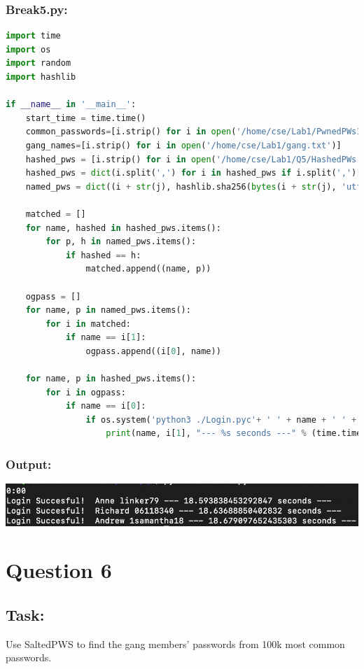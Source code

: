 \documentclass{article}
\begin{document}
\subsubsection*{Break5.py:}
\begin{lstlisting}[language=Python]
import time
import os
import random
import hashlib

if __name__ in '__main__': 
    start_time = time.time()
    common_passwords=[i.strip() for i in open('/home/cse/Lab1/PwnedPWs100k.txt')]
    gang_names=[i.strip() for i in open('/home/cse/Lab1/gang.txt')]
    hashed_pws = [i.strip() for i in open('/home/cse/Lab1/Q5/HashedPWs')]
    hashed_pws = dict(i.split(',') for i in hashed_pws if i.split(',')[0] in gang_names)
    named_pws = dict((i + str(j), hashlib.sha256(bytes(i + str(j), 'utf-8')).hexdigest()) for i in common_passwords for j in range(100))
    
    matched = []
    for name, hashed in hashed_pws.items():
        for p, h in named_pws.items():
            if hashed == h:
                matched.append((name, p))
    
    ogpass = []
    for name, p in named_pws.items():
        for i in matched:
            if name == i[1]:
                ogpass.append((i[0], name))

    for name, p in hashed_pws.items():
        for i in ogpass:
            if name == i[0]:
                if os.system('python3 ./Login.pyc'+ ' ' + name + ' ' + i[1] + " >/dev/null 2>&1") == 0:
                    print(name, i[1], "--- %s seconds ---" % (time.time() - start_time))
\end{lstlisting}
\subsubsection*{Output:}
\begin{center}
    \includegraphics[scale=.6]{images/Q5_Output.png}
\end{center}
\section{Question 6}
\subsection*{Task:}
Use SaltedPWS to find the gang members' passwords from 100k most common passwords.
\end{document}
